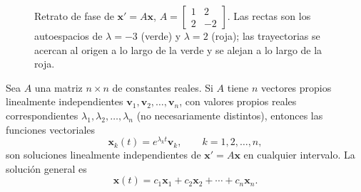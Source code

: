 \begin{figure}[H]
\centering
{}
\caption{Retrato de fase de $\mathbf x'=A\mathbf x$, $A=\begin{bmatrix}1&2\\2&-2\end{bmatrix}$. Las rectas son los autoespacios de $\lambda=-3$ (verde) y $\lambda=2$ (roja); las trayectorias se acercan al origen a lo largo de la verde y se alejan a lo largo de la roja.}
\label{fig:silla}
\end{figure}

\begin{theorem}\label{thm:n-indep}
Sea $A$ una matriz $n \times n$ de constantes reales. Si $A$ tiene $n$ vectores propios linealmente independientes $\mathbf{v}_1, \mathbf{v}_2, \ldots, \mathbf{v}_n$, con valores propios reales correspondientes $\lambda_1, \lambda_2, \ldots, \lambda_n$ (no necesariamente distintos), entonces las funciones vectoriales
\[
\mathbf{x}_k(t) = e^{\lambda_k t}\mathbf{v}_k, \qquad k = 1, 2, \ldots, n,
\]
son soluciones linealmente independientes de $\mathbf{x}' = A\mathbf{x}$ en cualquier intervalo. La soluci\'on general es
\[
\mathbf{x}(t) = c_1 \mathbf{x}_1 + c_2 \mathbf{x}_2 + \cdots + c_n \mathbf{x}_n.
\]
\end{theorem}

